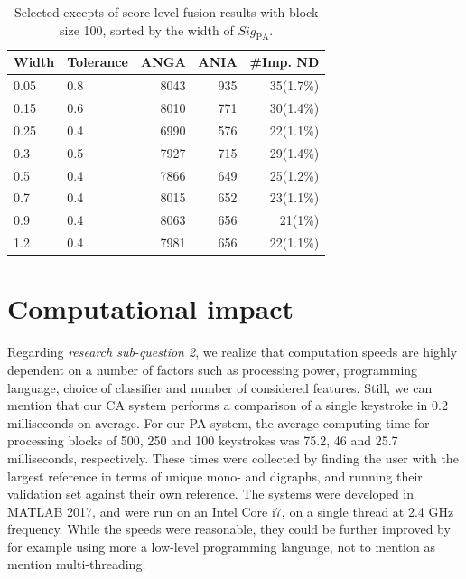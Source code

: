 \begin{table}[htbp]
\centering
\begin{tabular}{llrrr}
\hline
\textbf{Width} & \textbf{Tolerance} & \textbf{ANGA} & \textbf{ANIA} & \textbf{\#Imp. ND} \\ \hline
0.05           & 0.8                & 8043          & 935           & 35(1.7\%)          \\ %
0.15           & 0.6                & 8010          & 771           & 30(1.4\%)          \\ %
0.25           & 0.4                & 6990          & 576           & 22(1.1\%)          \\ %
0.3            & 0.5                & 7927          & 715           & 29(1.4\%)          \\ %
0.5            & 0.4                & 7866          & 649           & 25(1.2\%)          \\ %
0.7            & 0.4                & 8015          & 652           & 23(1.1\%)          \\ %
0.9            & 0.4                & 8063          & 656           & 21(1\%)            \\ %
1.2            & 0.4                & 7981          & 656           & 22(1.1\%)          \\ %
\end{tabular}
\caption{Selected excepts of score level fusion results with block size 100, sorted by the width of $\textit{Sig}_{\text{PA}}$.}
\label{tab:analysis-score-level-BL100}
\end{table}



\section{Computational impact}
\label{sec:analysis-computational-impact}
Regarding \textit{research sub-question 2}, we realize that computation speeds are highly dependent on a number of factors such as processing power, programming language, choice of classifier and number of considered features.
Still, we can mention that our CA system performs a comparison of a single keystroke in 0.2 milliseconds on average.
For our PA system, the average computing time for processing blocks of 500, 250 and 100 keystrokes was 75.2, 46 and 25.7 milliseconds, respectively.
These times were collected by finding the user with the largest reference in terms of unique mono- and digraphs, and running their validation set against their own reference.
The systems were developed in MATLAB 2017, and were run on an Intel Core i7, on a single thread at 2.4 GHz frequency.
While the speeds were reasonable, they could be further improved by for example using more a low-level programming language, not to mention as mention multi-threading.

